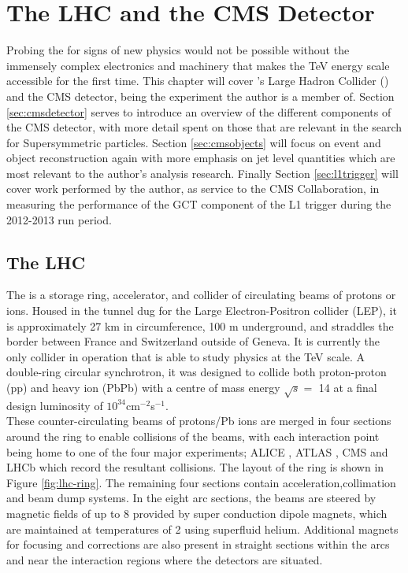 \chapter{The LHC and the CMS Detector}
\label{chap:cmsoverview}

Probing the \SM for signs of new physics would not be possible without the immensely complex electronics and machinery that makes the TeV energy scale accessible for the first time. This chapter will cover \CERN 's  Large Hadron Collider (\LHC) and the CMS detector, being the experiment the author is a member of. Section \ref{sec:cmsdetector} serves to introduce an overview of the different components of  the CMS detector, with more detail spent on those that are relevant in the search for Supersymmetric particles. Section \ref{sec:cmsobjects} will focus on event and object reconstruction again with more emphasis on jet level quantities which are most relevant to the author's analysis research. Finally Section \ref{sec:l1trigger} will cover work performed by the author, as service to the CMS Collaboration, in measuring the performance of the GCT component of the L1 trigger during the 2012-2013 run period.  


\section{The LHC}
\label{sec:thelhc} 

The \LHC is a storage ring, accelerator, and collider of circulating beams of protons or ions. Housed in the tunnel dug for the Large Electron-Positron collider (LEP), it is approximately 27 km in circumference, 100 m underground, and straddles the border between France and Switzerland outside of Geneva. It is currently the only collider in operation that is able to study physics at the TeV scale.  A double-ring circular synchrotron, it was
designed to collide both proton-proton (pp) and heavy ion (PbPb) with a centre of mass energy $\sqrt{s} = $ 14 \TeV at a final design luminosity of $10^{34}$cm$^{-2}$s$^{-1}$. \\

These counter-circulating beams of protons/Pb ions are merged in four sections around the ring to enable collisions of the beams, with each interaction point being home to one of the four major experiments; ALICE \cite{alicetdr} , ATLAS \cite{atlastdr}, CMS \cite{cmstdr} and LHCb \cite{lhcbtdr} which record the resultant collisions. The layout of the \LHC ring is shown in Figure \ref{fig:lhc-ring}. The remaining four sections contain acceleration,collimation and beam dump systems. In the eight arc sections, the beams are steered by magnetic fields of up to 8 \T provided by super conduction dipole magnets, which are maintained at temperatures of 2 \K using superfluid helium. Additional magnets for focusing and corrections are also present in straight sections within the arcs and near the interaction regions where the detectors are situated. \\


